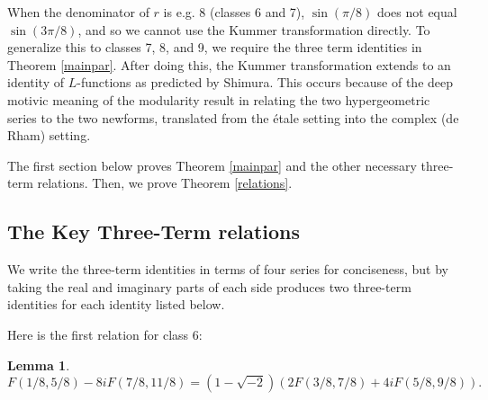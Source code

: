 \documentclass[12pt]{amsart}
\newtheorem{Lemma}[theorem]{Lemma}
\theoremstyle{definition}
\theoremstyle{remark}
\begin{document}
When the denominator of $r$ is e.g. 8 (classes 6 and 7), $\sin(\pi/8)$ does not equal $\sin(3\pi/8)$, and so we cannot use the Kummer transformation directly. To generalize this to classes 7, 8, and 9, we require the three term identities in Theorem \ref{mainpar}.  After doing this, the Kummer transformation extends to an identity of $L$-functions as predicted by Shimura. This occurs because of the deep motivic meaning of the modularity result in \cite{aglt} relating the two hypergeometric series to the two newforms,
translated from the \'etale setting into the complex (de Rham) setting. 

The first section below proves Theorem \ref{mainpar} and the other necessary three-term relations. Then, we prove Theorem \ref{relations}.



\subsection{The Key Three-Term relations}
We write the three-term identities in terms of four series for conciseness, but by taking the real and imaginary parts of each side produces two three-term identities for each identity listed below.

Here is the first relation for class 6: 
\begin{Lemma}\label{l1}
    $$F(1/8,5/8)-8iF(7/8,11/8)=(1-\sqrt{-2})(2F(3/8,7/8)+4iF(5/8,9/8)).$$
\end{Lemma}
\end{document}
